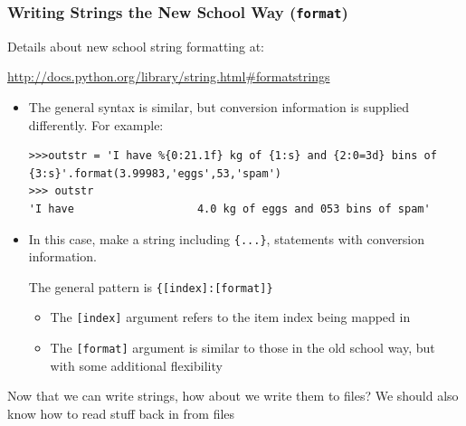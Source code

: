\documentclass{beamer}
\newcommand\Fontvi{\fontsize{8.5}{7.2}\selectfont}
\begin{document}
\begin{frame}[fragile]
\frametitle{Writing Strings the New School Way (\texttt{format})}
Details about new school string formatting at:\newline{}
\begin{small}
\Fontvi
\url{http://docs.python.org/library/string.html#formatstrings}
\end{small}
\begin{itemize}
\item The general syntax is similar, but conversion information is supplied differently. For example:
\begin{lstlisting}
>>>outstr = 'I have %{0:21.1f} kg of {1:s} and {2:0=3d} bins of {3:s}'.format(3.99983,'eggs',53,'spam')
>>> outstr
'I have                   4.0 kg of eggs and 053 bins of spam'
\end{lstlisting}
\item In this case, make a string including \texttt{\{...\}}, statements with conversion information.

The general pattern is \texttt{\{[index]:[format]\}}\newline{}
\begin{itemize}
\item The \texttt{[index]} argument refers to the item index being mapped in\newline{}
\item The \texttt{[format]} argument is similar to those in the old school way, but with some additional flexibility
\end{itemize}

\end{itemize}
\end{frame}

\begin{frame}[fragile]
Now that we can write strings, how about we write them to files? \newline{}
We should also know how to read stuff back in from files
\end{frame}
\end{document}
